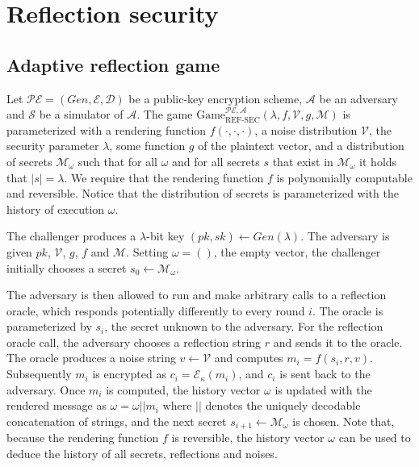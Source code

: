 \documentclass[conference, letterpaper, 10pt]{IEEEtran}
\begin{document}
\section{Reflection security}\label{sec:refsec}

\subsection{Adaptive reflection game}\label{subsec:refsecgame}

Let $\mathcal{PE} = (Gen, \mathcal{E}, \mathcal{D})$ be a public-key
encryption scheme, $\mathcal{A}$ be an adversary and $\mathcal{S}$ be a
simulator of $\mathcal{A}$.  The game
$\text{Game}_{\text{REF-SEC}}^{\mathcal{PE},\mathcal{A}}(\lambda,  f,
\mathcal{V}, g, \mathcal{M})$ is parameterized with a rendering function $f(\cdot, \cdot,
\cdot)$, a noise distribution $\mathcal{V}$, the security parameter $\lambda$,
some function $g$ of the plaintext vector, and a distribution of secrets $\mathcal{M}_\omega$
such that for all $\omega$ and for all secrets $s$ that exist in
$\mathcal{M}_\omega$ it holds that $|s| = \lambda$. We
require that the rendering function $f$ is polynomially computable and
reversible. Notice that the distribution of secrets is parameterized with the
history of execution $\omega$.

The challenger produces a $\lambda$-bit key $(pk, sk) \leftarrow
Gen(\lambda)$. The adversary is given $pk$, $\mathcal{V}$, $g$, $f$ and
$\mathcal{M}$.
Setting $\omega = ()$, the empty vector, the challenger initially chooses
a secret $s_0 \leftarrow \mathcal{M}_\omega$.

The adversary is then allowed to run and make arbitrary calls to a reflection
oracle, which responds potentially differently to every round $i$. The oracle
is parameterized by $s_i$, the secret unknown to the
adversary.  For the reflection oracle call, the adversary chooses a reflection
string $r$ and sends it to the oracle. The oracle produces a noise string
$v \leftarrow \mathcal{V}$ and computes $m_i = f(s_i, r, v)$. Subsequently
$m_i$ is encrypted as $c_i = \mathcal{E}_\kappa(m_i)$, and $c_i$ is sent back
to the adversary. Once $m_i$ is computed, the history vector $\omega$ is updated
with the rendered message as $\omega = \omega || m_i$ where $||$ denotes the
uniquely decodable concatenation of strings, and the next secret $s_{i+1}
\leftarrow \mathcal{M}_\omega$ is chosen. Note that, because the rendering
function $f$ is reversible, the history vector $\omega$ can be used to deduce
the history of all secrets, reflections and noises.
\end{document}
